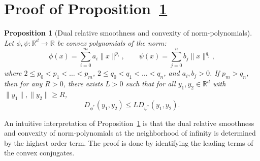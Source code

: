 \documentclass{article}
\theoremstyle{plain}
\newtheorem{proposition}[theorem]{Proposition}
\theoremstyle{definition}
\theoremstyle{remark}
\begin{document}
\section{Proof of Proposition~\ref{prop:dual_relative_smoothness}}
\label{section_polynomialnorm_proof}

\begin{proposition}[Dual relative smoothness and convexity of norm-polynomials]
\label{prop:dual_relative_smoothness}
Let $\phi,\psi:\mathbb{R}^d\to\mathbb{R}$ be convex polynomials of the norm:
\[
\phi(x) = \sum_{i=0}^m a_i \|x\|^{p_i}, \qquad
\psi(x) = \sum_{j=0}^n b_j \|x\|^{q_j},
\]
where $2 \leq p_0 < p_1 < \dots < p_m$, $2 \leq q_0 < q_1 < \dots < q_n$, and $a_i,b_j>0$. If $p_m > q_n$,
then for any $R>0$, there exists $L>0$ such that for all $y_1, y_2 \in \mathbb{R}^d$ with $\|y_1\|, \|y_2\| \geq R$,
$$D_{\phi^*}(y_1, y_2) \leq L D_{\psi^*}(y_1, y_2).$$
\end{proposition}

An intuitive interpretation of Proposition~\ref{prop:dual_relative_smoothness} is that the dual relative smoothness and convexity of norm-polynomials at the neighborhood of infinity is determined by the highest order term. The proof is done by identifying the leading terms of the convex conjugates. 
\end{document}
